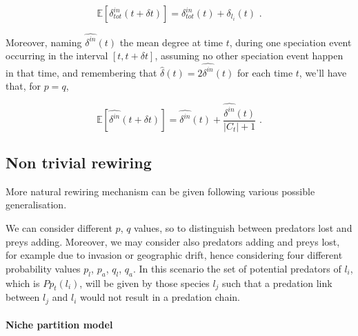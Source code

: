 \documentclass[12pt,a4paper]{report}
\begin{document}
\begin{equation}
\mathbb{E}\left[\delta^{in}_{tot}(t + \delta t)\right] = \delta^{in}_{tot}(t) + \delta_{l_i}(t) \, \, .
\end{equation}

Moreover, naming $\widehat{\delta^{in}}(t)$ the mean degree at time $t$, during one speciation event occurring in the interval $\left[t,t + \delta t \right]$, assuming no other speciation event happen in that time, and remembering that $\hat{\delta}(t)=2\widehat{\delta^{in}}(t)$ for each time $t$, we'll have that, for $p = q$,

\begin{equation}
\mathbb{E}\left[\widehat{\delta^{in}}(t + \delta t)\right] = \widehat{\delta^{in}}(t) +  \frac{\widehat{\delta^{in}}(t)}{|C_t|+1} \, \, .
\end{equation}

\subsection{Non trivial rewiring}\label{rewiring_model}

More natural rewiring mechanism can be given following various possible generalisation.

We can consider different $p$, $q$ values, so to distinguish between predators lost and preys adding. Moreover, we may consider also predators adding and preys lost, for example due to invasion or geographic drift, hence considering four different probability values $p_l$, $p_a$, $q_l$, $q_a$. In this scenario the set of potential predators of $l_i$, which is $Pp_t(l_i)$, will be given by those species $l_j$ such that a predation link between $l_j$ and $l_i$ would not result in a predation chain.

\paragraph{Niche partition model}
\end{document}
